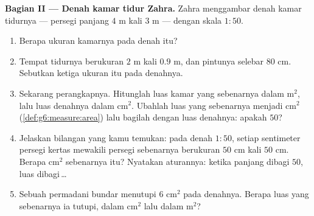 \begin{problem}
\medskip
\noindent\textbf{Bagian II --- Denah kamar tidur Zahra.}
Zahra menggambar denah kamar tidurnya --- persegi panjang $4$ m kali
$3$ m --- dengan skala $1:50$.
\begin{enumerate}[resume]
  \item Berapa ukuran kamarnya pada denah itu?
  \item Tempat tidurnya berukuran $2$ m kali $0.9$ m, dan pintunya
        selebar $80$ cm. Sebutkan ketiga ukuran itu pada denahnya.
  \item Sekarang perangkapnya. Hitunglah luas kamar yang sebenarnya
        dalam m$^2$, lalu luas denahnya dalam cm$^2$. Ubahlah luas
        yang sebenarnya menjadi cm$^2$
        (\cref{def:g6:measure:area}) lalu bagilah dengan luas
        denahnya: apakah  $50$?
  \item Jelaskan bilangan yang kamu temukan: pada denah $1:50$, setiap
        sentimeter persegi kertas mewakili persegi sebenarnya
        berukuran $50$ cm kali $50$ cm. Berapa cm$^2$ sebenarnya itu?
        Nyatakan aturannya: ketika panjang dibagi $50$, luas
        dibagi\,\dots
  \item Sebuah permadani bundar menutupi $6$ cm$^2$ pada denahnya.
        Berapa luas yang sebenarnya ia tutupi, dalam cm$^2$ lalu
        dalam m$^2$?
\end{enumerate}


\end{problem}
